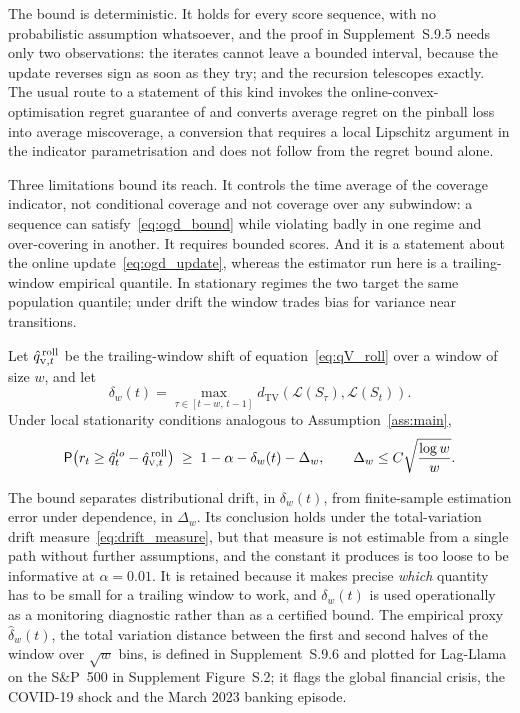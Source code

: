 The bound is deterministic. It holds for every score sequence, with no
probabilistic assumption whatsoever, and the proof in Supplement~S.9.5 needs only
two observations: the iterates cannot leave a bounded interval, because the
update reverses sign as soon as they try; and the recursion telescopes exactly.
The usual route to a statement of this kind invokes the online-convex-optimisation
regret guarantee of \citet{zinkevich2003online} and converts average regret on
the pinball loss into average miscoverage, a conversion that requires a local
Lipschitz argument in the indicator parametrisation and does not follow from the
regret bound alone.

Three limitations bound its reach. It controls the time average of the coverage
indicator, not conditional coverage and not coverage over any subwindow: a
sequence can satisfy~\eqref{eq:ogd_bound} while violating badly in one regime and
over-covering in another. It requires bounded scores. And it is a statement about
the online update~\eqref{eq:ogd_update}, whereas the estimator run here is a
trailing-window empirical quantile. In stationary regimes the two target the same
population quantile; under drift the window trades bias for variance near
transitions.

\begin{proposition}
	\label{prop:rolling_drift}
	Let $\hat{q}_{{\scriptscriptstyle\mathrm{V}},t}^{\,\mathrm{roll}}$ be the trailing-window shift of
	equation~\eqref{eq:qV_roll} over a window of size $w$, and let
	\begin{equation}
		\label{eq:drift_measure}
		\delta_w(t) = \max_{\tau\in[t-w,\,t-1]}
		d_{\mathrm{TV}}\!\left(\mathcal L(S_\tau),\mathcal L(S_t)\right).
	\end{equation}
	Under local stationarity conditions analogous to
	Assumption~\ref{ass:main},
	\begin{equation}
		\label{eq:rolling_bound}
		\mathsf{P}\!\left(r_t\ge\hat q_t^{lo}-\hat{q}_{{\scriptscriptstyle\mathrm{V}},t}^{\,\mathrm{roll}}\right)
		\;\ge\;
		1-\alpha-\delta_w(t)-\Delta_w,
		\qquad
		\Delta_w\le C\sqrt{\frac{\log w}{w}}.
	\end{equation}
\end{proposition}

The bound separates distributional drift, in $\delta_w(t)$, from finite-sample
estimation error under dependence, in $\Delta_w$. Its conclusion holds under the
total-variation drift measure~\eqref{eq:drift_measure}, but that measure is not
estimable from a single path without further assumptions, and the constant it
produces is too loose to be informative at $\alpha = 0.01$. It is retained
because it makes precise \emph{which} quantity has to be small for a trailing
window to work, and $\delta_w(t)$ is used operationally as a monitoring
diagnostic rather than as a certified bound. The empirical proxy
$\hat\delta_w(t)$, the total variation distance between the first and second
halves of the window over $\sqrt w$ bins, is defined in Supplement~S.9.6 and
plotted for Lag-Llama on the S\&P~500 in Supplement Figure~S.2; it flags the
global financial crisis, the COVID-19 shock and the March 2023 banking episode.

